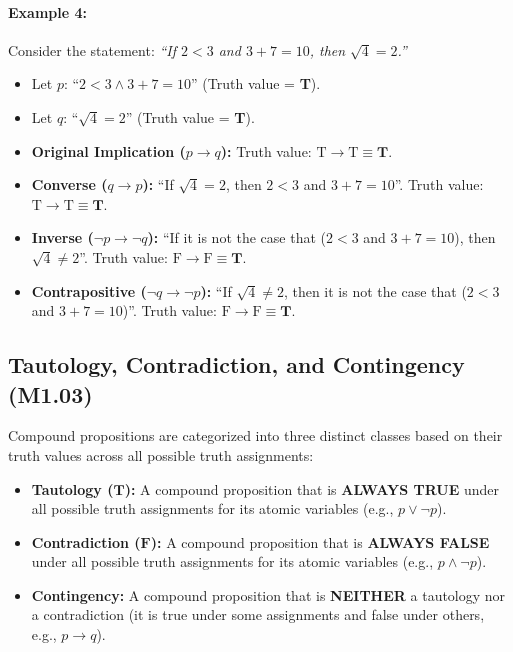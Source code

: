 \documentclass[11pt,a4paper]{article}
\begin{document}
\paragraph{Example 4:}
Consider the statement: \textit{``If $2 < 3$ and $3 + 7 = 10$, then $\sqrt{4} = 2$.''}
\begin{itemize}[leftmargin=1.5em]
    \item Let $p$: ``$2 < 3 \land 3 + 7 = 10$'' (Truth value = \textbf{T}).
    \item Let $q$: ``$\sqrt{4} = 2$'' (Truth value = \textbf{T}).
    \item \textbf{Original Implication ($p \rightarrow q$):} Truth value: $\text{T} \rightarrow \text{T} \equiv \mathbf{T}$.
    \item \textbf{Converse ($q \rightarrow p$):} ``If $\sqrt{4} = 2$, then $2 < 3$ and $3 + 7 = 10$''. Truth value: $\text{T} \rightarrow \text{T} \equiv \mathbf{T}$.
    \item \textbf{Inverse ($\neg p \rightarrow \neg q$):} ``If it is not the case that ($2 < 3$ and $3 + 7 = 10$), then $\sqrt{4} \ne 2$''. Truth value: $\text{F} \rightarrow \text{F} \equiv \mathbf{T}$.
    \item \textbf{Contrapositive ($\neg q \rightarrow \neg p$):} ``If $\sqrt{4} \ne 2$, then it is not the case that ($2 < 3$ and $3 + 7 = 10$)''. Truth value: $\text{F} \rightarrow \text{F} \equiv \mathbf{T}$.
\end{itemize}

\subsection{Tautology, Contradiction, and Contingency (M1.03)}

Compound propositions are categorized into three distinct classes based on their truth values across all possible truth assignments:

\begin{definition}
\begin{itemize}[leftmargin=1.5em]
    \item \textbf{Tautology ($\mathbf{T}$):} A compound proposition that is \textbf{ALWAYS TRUE} under all possible truth assignments for its atomic variables (e.g., $p \lor \neg p$).
    \item \textbf{Contradiction ($\mathbf{F}$):} A compound proposition that is \textbf{ALWAYS FALSE} under all possible truth assignments for its atomic variables (e.g., $p \land \neg p$).
    \item \textbf{Contingency:} A compound proposition that is \textbf{NEITHER} a tautology nor a contradiction (it is true under some assignments and false under others, e.g., $p \rightarrow q$).
\end{itemize}
\end{definition}
\end{document}
